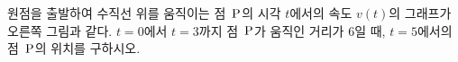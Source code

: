 \noindent\begin{minipage}[t]{0.58\linewidth}\vspace{0pt}\raggedright 원점을 출발하여 수직선 위를 움직이는 점~$\mathrm{P}$의 시각 $t$에서의 속도 $v(t)$의 그래프가 오른쪽 그림과 같다. $t=0$에서 $t=3$까지 점~$\mathrm{P}$가 움직인 거리가 $6$일 때, $t=5$에서의 점~$\mathrm{P}$의 위치를 구하시오.\end{minipage}\hfill\begin{minipage}[t]{0.4\linewidth}\vspace{0pt}\centering \resizebox{\ifdim\width>\linewidth\linewidth\else\width\fi}{!}{}\end{minipage}\par
